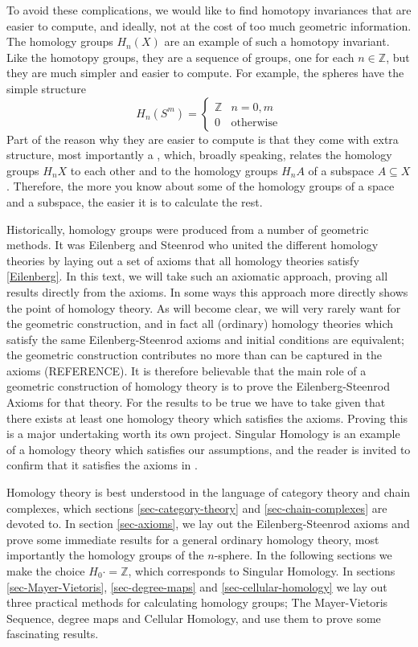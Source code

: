 To avoid these complications, we would like to find homotopy invariances that are easier to compute, and ideally, not at the cost of too much geometric information. The homology groups $H_n(X)$ are an example of such a homotopy invariant. Like the homotopy groups, they are a sequence of groups, one for each $n\in \mathbb{Z}$, but they are much simpler and easier to compute. For example, the spheres have the simple structure $$H_n(S^m)=\begin{cases}\mathbb{Z} & n=0,m\\ 0 & \text{otherwise}\end{cases}$$
Part of the reason why they are easier to compute is that they come with extra structure, most importantly a , which, broadly speaking, relates the homology groups $H_nX$ to each other and to the homology groups $H_nA$ of a subspace $A\subseteq X$. Therefore, the more you know about some of the homology groups of a space and a subspace, the easier it is to calculate the rest.

Historically, homology groups were produced from a number of geometric methods. It was Eilenberg and Steenrod who united the different homology theories by laying out a set of axioms that all homology theories satisfy \ref{Eilenberg}. In this text, we will take such an axiomatic approach, proving all results directly from the axioms. In some ways this approach more directly shows the point of homology theory. As will become clear, we will very rarely want for the geometric construction, and in fact all (ordinary) homology theories which satisfy the same Eilenberg-Steenrod axioms and initial conditions are equivalent; the geometric construction contributes no more than can be captured in the axioms (REFERENCE). It is therefore believable that the main role of a geometric construction of homology theory is to prove the Eilenberg-Steenrod Axioms for that theory. For the results to be true we have to take given that there exists at least one homology theory which satisfies the axioms. Proving this is a major undertaking worth its own project. Singular Homology is an example of a homology theory which satisfies our assumptions, and the reader is invited to confirm that it satisfies the axioms in \cite{Hatcher}.

Homology theory is best understood in the language of category theory and chain complexes, which sections \ref{sec-category-theory} and \ref{sec-chain-complexes} are devoted to. In section \ref{sec-axioms}, we lay out the Eilenberg-Steenrod axioms and prove some immediate results for a general ordinary homology theory, most importantly the homology groups of the $n$-sphere. In the following sections we make the choice $H_0 \cdot=\mathbb{Z}$, which corresponds to Singular Homology. In sections \ref{sec-Mayer-Vietoris}, \ref{sec-degree-maps} and \ref{sec-cellular-homology} we lay out three practical methods for calculating homology groups; The Mayer-Vietoris Sequence, degree maps and Cellular Homology, and use them to prove some fascinating results.